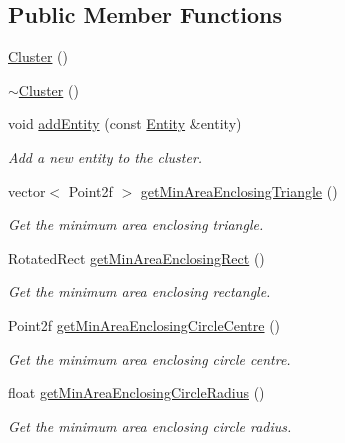 \subsection*{Public Member Functions}
\begin{DoxyCompactItemize}
\item 
\hyperlink{classmultiscale_1_1analysis_1_1Cluster_aee7feb1d599d4c8fda6c3ee83e86ba81}{Cluster} ()
\item 
\hyperlink{classmultiscale_1_1analysis_1_1Cluster_a4bddfc88ac859610acab15dd12851b58}{$\sim$\-Cluster} ()
\item 
void \hyperlink{classmultiscale_1_1analysis_1_1Cluster_a2bc85629ab2bd6d01c6d2df3d79ba497}{add\-Entity} (const \hyperlink{classmultiscale_1_1analysis_1_1Entity}{Entity} \&entity)
\begin{DoxyCompactList}\small\item\em Add a new entity to the cluster. \end{DoxyCompactList}\item 
vector$<$ Point2f $>$ \hyperlink{classmultiscale_1_1analysis_1_1Cluster_ab28150a739c35d66874c219fd38b462b}{get\-Min\-Area\-Enclosing\-Triangle} ()
\begin{DoxyCompactList}\small\item\em Get the minimum area enclosing triangle. \end{DoxyCompactList}\item 
Rotated\-Rect \hyperlink{classmultiscale_1_1analysis_1_1Cluster_a6417e3328622a848a7dedeebb5821750}{get\-Min\-Area\-Enclosing\-Rect} ()
\begin{DoxyCompactList}\small\item\em Get the minimum area enclosing rectangle. \end{DoxyCompactList}\item 
Point2f \hyperlink{classmultiscale_1_1analysis_1_1Cluster_a4d93f85faf929336818248e1fd604fb6}{get\-Min\-Area\-Enclosing\-Circle\-Centre} ()
\begin{DoxyCompactList}\small\item\em Get the minimum area enclosing circle centre. \end{DoxyCompactList}\item 
float \hyperlink{classmultiscale_1_1analysis_1_1Cluster_aecf5fa56fa21e3b22130242694be744f}{get\-Min\-Area\-Enclosing\-Circle\-Radius} ()
\begin{DoxyCompactList}\small\item\em Get the minimum area enclosing circle radius. \end{DoxyCompactList}\item 

\end{DoxyCompactItemize}
